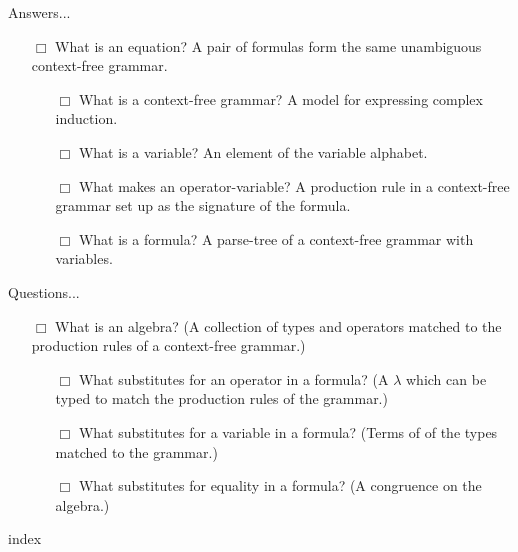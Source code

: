 \documentclass[12pt,twoside,letterpaper]{memoir}
\begin{document}
\newpage
{\huge Answers...}
\begin{itemize}
      \item[$\Box$] What is an equation? A pair of formulas form the same unambiguous context-free grammar.
      \begin{itemize}
          \item[$\Box$] What is a context-free grammar? A model for expressing complex induction.
  
          \item[$\Box$] What is a variable? An element of the variable alphabet.
  
          \item[$\Box$] What makes an operator-variable? 
          A production rule in a context-free grammar set up as the signature of the formula.
  
          \item[$\Box$] What is a formula? A parse-tree of a context-free grammar with variables.

          
  
      \end{itemize}
\end{itemize}
{\huge Questions...}
\begin{itemize}
      \item[$\Box$] What is an algebra? (A collection of types and operators matched to the 
      production rules of a context-free grammar.)
      \begin{itemize}
          \item[$\Box$] What substitutes for an operator in a formula? 
          (A $\lambda$ which can be typed to match the production rules of the grammar.)
  
          \item[$\Box$] What substitutes for a variable in a formula?
          (Terms of of the types matched to the grammar.)
          
          \item[$\Box$] What substitutes for equality in a formula? 
          (A congruence on the algebra.)
      \end{itemize} 
      
  \end{itemize}





{index}
\end{document}
